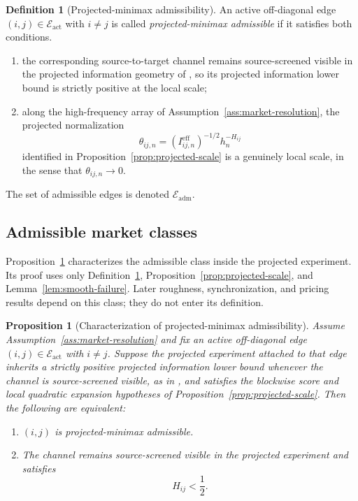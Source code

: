 \documentclass[11pt,a4paper]{amsart}
\theoremstyle{plain}
\newtheorem{proposition}[theorem]{Proposition}
\theoremstyle{definition}
\newtheorem{definition}[theorem]{Definition}
\theoremstyle{remark}
\newcommand{\cE}{\mathcal{E}}
\begin{document}
\begin{definition}[Projected-minimax admissibility]\label{def:market-admissibility}
An active off-diagonal edge \((i,j)\in\cE_{\mathrm{act}}\) with \(i\neq j\) is called
\emph{projected-minimax admissible} if it satisfies both conditions.
\begin{enumerate}[label=(\roman*)]
\item the corresponding source-to-target channel remains source-screened visible in the projected
information geometry of \cite{vidal2026econometric}, so its projected information lower bound is
strictly positive at the local scale;
\item along the high-frequency array of Assumption~\ref{ass:market-resolution}, the projected
normalization
\[
        \theta_{ij,n}
        =
        (I_{ij,n}^{\mathrm{eff}})^{-1/2}h_n^{-H_{ij}}
\]
identified in Proposition~\ref{prop:projected-scale} is a genuinely local scale, in the sense that
\(\theta_{ij,n}\to0\).
\end{enumerate}
The set of admissible edges is denoted \(\cE_{\mathrm{adm}}\).
\end{definition}

\subsection{Admissible market classes}

\noindent
Proposition~\ref{prop:admissibility-characterization} characterizes the admissible class inside the
projected experiment.  Its proof uses only Definition~\ref{def:market-admissibility},
Proposition~\ref{prop:projected-scale}, and Lemma~\ref{lem:smooth-failure}.  Later roughness,
synchronization, and pricing results depend on this class; they do not enter its definition.

\begin{proposition}[Characterization of projected-minimax admissibility]\label{prop:admissibility-characterization}
Assume Assumption~\ref{ass:market-resolution} and fix an active off-diagonal edge
\((i,j)\in\cE_{\mathrm{act}}\) with \(i\neq j\).  Suppose the projected experiment attached to that edge
inherits a strictly positive projected information lower bound whenever the channel is
source-screened visible, as in \cite{vidal2026econometric}, and satisfies the blockwise score and
local quadratic expansion hypotheses of Proposition~\ref{prop:projected-scale}.  Then the
following are equivalent:
\begin{enumerate}[label=(\roman*)]
\item \((i,j)\) is projected-minimax admissible.
\item The channel remains source-screened visible in the projected experiment and satisfies
\[
        H_{ij}<\frac12.
\]
\end{enumerate}
\end{proposition}
\end{document}
